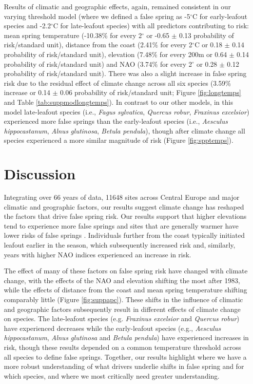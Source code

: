 \documentclass{article}\usepackage[]{graphicx}\usepackage[]{color}
\begin{document}
Results of climatic and geographic effects, again, remained consistent in our varying threshold model (where we defined a false spring as -5$^{\circ}$C for early-leafout species and -2.2$^{\circ}$C for late-leafout species) with all predictors contributing to risk: mean spring temperature (-10.38\% for every 2$^\circ$ or -0.65 $\pm$ 0.13 probability of risk/standard unit), distance from the coast (2.41\% for every 2$^\circ$C or 0.18 $\pm$ 0.14 probability of risk/standard unit), elevation (7.48\% for every 200m or 0.64 $\pm$ 0.14 probability of risk/standard unit) and NAO (3.74\% for every 2$^\circ$ or 0.28 $\pm$ 0.12 probability of risk/standard unit). There was also a slight increase in false spring risk due to the residual effect of climate change across all six species (3.59\% increase or 0.14 $\pm$ 0.06 probability of risk/standard unit; Figure \ref{fig:longtemps} and Table \ref{tab:suppmodlongtemps}). In contrast to our other models, in this model late-leafout species (i.e., \textit{Fagus sylvatica}, \textit{Quercus robur}, \textit{Fraxinus excelsior}) experienced more false springs than the early-leafout species (i.e., \textit{Aesculus hippocastanum}, \textit{Alnus glutinosa}, \textit{Betula pendula}), though after climate change all species experienced a more similar magnitude of risk (Figure \ref{fig:spptemps}). 

\section*{Discussion} %
Integrating over 66 years of data, 11648 sites across Central Europe and major climatic and geographic factors, our results suggest climate change has reshaped the factors that drive false spring risk. Our results support that higher elevations tend to experience more false springs \citep{Vitra2017,Vitasse2018} and sites that are generally warmer have lower risks of false springs \citep{Wypych2016}. Individuals further from the coast typically initiated leafout earlier in the season, which subsequently increased risk and, similarly, years with higher NAO indices experienced an increase in risk. 

The effect of many of these factors on false spring risk have changed with climate change, with the effects of the NAO and elevation shifting the most after 1983, while the effects of distance from the coast and mean spring temperature shifting comparably little (Figure \ref{fig:suppapc}). These shifts in the influence of climatic and geographic factors subsequently result in different effects of climate change on species. The late-leafout species (e.g. \textit{Fraxinus excelsior} and \textit{Quercus robur}) have experienced decreases while the early-leafout species (e.g., \textit{Aesculus hippocastanum}, \textit{Alnus glutinosa} and \textit{Betula pendula}) have experienced increases in risk, though these results depended on a common temperature threshold across all species to define false springs. Together, our results highlight where we have a more robust understanding of what drivers underlie shifts in false spring and for which species, and where we most critically need greater understanding.
\end{document}
